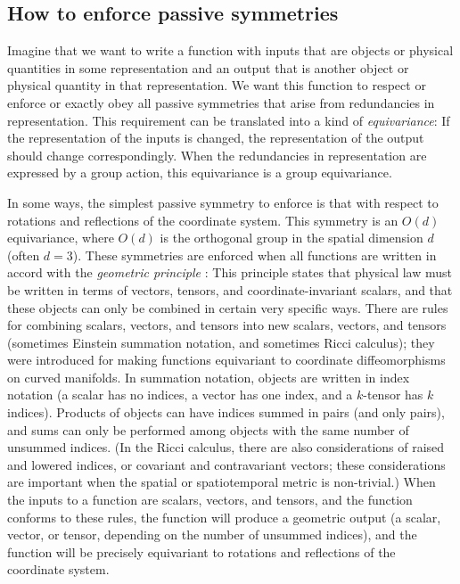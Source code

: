 \documentclass{article}
\theoremstyle{plain}
\theoremstyle{definition}
\theoremstyle{remark}
\begin{document}
\subsection*{How to enforce passive symmetries}

Imagine that we want to write a function with inputs that are objects or physical quantities in some representation and an output that is another object or physical quantity in that representation.
We want this function to respect or enforce or exactly obey all passive symmetries that arise from redundancies in representation.
This requirement can be translated into a kind of \emph{equivariance}:
If the representation of the inputs is changed, the representation of the output should change correspondingly.
When the redundancies in representation are expressed by a group action, this equivariance is a group equivariance.

In some ways, the simplest passive symmetry to enforce is that with respect to rotations and reflections of the coordinate system.
This symmetry is an $O(d)$ equivariance, where $O(d)$ is the orthogonal group in the spatial dimension $d$ (often $d=3$).
These symmetries are enforced when all functions are written in accord with the \emph{geometric principle} \cite{mcp}:
This principle states that physical law must be written in terms of vectors, tensors, and coordinate-invariant scalars, and that these objects can only be combined in certain very specific ways.
There are rules for combining scalars, vectors, and tensors into new scalars, vectors, and tensors (sometimes Einstein \cite{einstein} summation notation, and sometimes Ricci \cite{ricci} calculus); they were introduced for making functions equivariant to coordinate diffeomorphisms on curved manifolds.
In summation notation, objects are written in index notation (a scalar has no indices, a vector has one index, and a $k$-tensor has $k$ indices).
Products of objects can have indices summed in pairs (and only pairs), and sums can only be performed among objects with the same number of unsummed indices.
(In the Ricci calculus, there are also considerations of raised and lowered indices, or covariant and contravariant vectors; these considerations are important when the spatial or spatiotemporal metric is non-trivial.)
When the inputs to a function are scalars, vectors, and tensors, and the function conforms to these rules, the function will produce a geometric output (a scalar, vector, or tensor, depending on the number of unsummed indices), and the function will be precisely equivariant to rotations and reflections of the coordinate system.
\end{document}
